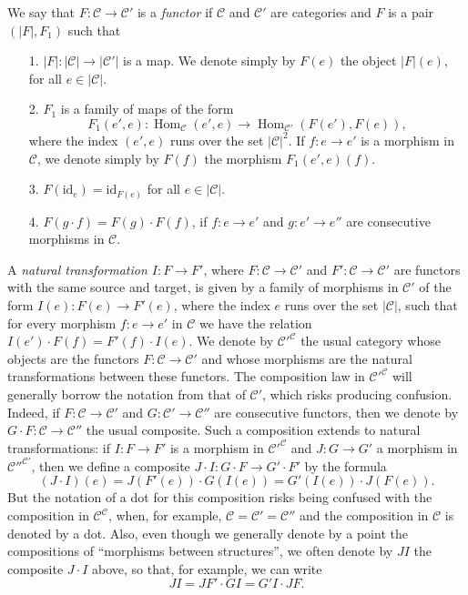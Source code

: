 \documentclass{article}
\newcommand{\oldpage}[1]{\marginpar{\footnotesize$\Big\vert$ \textit{p.~#1}}}
\newcommand{\cat}[1]{\mathcal{#1}}
\newcommand{\set}[1]{|#1|}
\newcommand{\id}{\mathrm{id}}
\DeclareMathOperator{\Hom}{Hom}
\begin{document}
We say that $F\colon\cat{C}\to\cat{C}'$ is a \emph{functor} if $\cat{C}$ and $\cat{C}'$ are categories and $F$ is a pair $(\set{F},F_1)$ such that

\begin{enumerate}
  \item[1\textquotesingle.] $\set{F}\colon\set{\cat{C}}\to\set{\cat{C}'}$ is a map.
    We denote simply by $F(e)$ the object $\set{F}(e)$, for all $e\in\set{\cat{C}}$.

  \item[2\textquotesingle.] $F_1$ is a family of maps of the form
    \[
      F_1(e',e)\colon
      \Hom_\cat{C}(e',e)
      \to \Hom_{\cat{C}'}(F(e'),F(e)),
    \]
    where the index $(e',e)$ runs over the set $\set{\cat{C}}^2$.
    If $f\colon e\to e'$ is a morphism in $\cat{C}$, we denote simply by $F(f)$ the morphism $F_1(e',e)(f)$.

  \item[3\textquotesingle.] $F(\id_e)=\id_{F(e)}$ for all $e\in\set{\cat{C}}$.

  \item[4\textquotesingle.] $F(g\cdot f)=F(g)\cdot F(f)$, if $f\colon e\to e'$ and $g\colon e'\to e''$ are consecutive morphisms in $\cat{C}$.
\end{enumerate}

A \emph{natural transformation $I\colon F\to F'$}, where $F\colon\cat{C}\to\cat{C}'$ and $F'\colon\cat{C}\to\cat{C}'$ are functors with the same source and target, is given by a family of morphisms in $\cat{C}'$ of the form $I(e)\colon F(e)\to F'(e)$, where the index $e$ runs over the set $\set{\cat{C}}$, such that for every morphism $f\colon e\to e'$ in $\cat{C}$ we have the relation $I(e')\cdot F(f)=F'(f)\cdot I(e)$.
\oldpage{221}
We denote by $\cat{C}'^{\cat{C}}$ the usual category whose objects are the functors $F\colon\cat{C}\to\cat{C}'$ and whose morphisms are the natural transformations between these functors.
The composition law in $\cat{C}'^{\cat{C}}$ will generally borrow the notation from that of $\cat{C}'$, which risks producing confusion.
Indeed, if $F\colon\cat{C}\to\cat{C}'$ and $G\colon\cat{C}'\to\cat{C}''$ are consecutive functors, then we denote by $G\cdot F\colon\cat{C}\to\cat{C}''$ the usual composite.
Such a composition extends to natural transformations: if $I\colon F\to F'$ is a morphism in $\cat{C}'^{\cat{C}}$ and $J\colon G\to G'$ a morphism in $\cat{C}''^{\cat{C}'}$, then we define a composite $J\cdot I\colon G\cdot F\to G'\cdot F'$ by the formula
\[
  (J\cdot I)(e)
  = J(F'(e))\cdot G(I(e))
  = G'(I(e))\cdot J(F(e)).
\]
But the notation of a dot for this composition risks being confused with the composition in $\cat{C}^\cat{C}$, when, for example, $\cat{C}=\cat{C}'=\cat{C}''$ and the composition in $\cat{C}$ is denoted by a dot.
Also, even though we generally denote by a point the compositions of ``morphisms between structures'', we often denote by $JI$ the composite $J\cdot I$ above, so that, for example, we can write
\[
  JI
  = JF'\cdot GI
  = G'I\cdot JF.
\]
\end{document}
